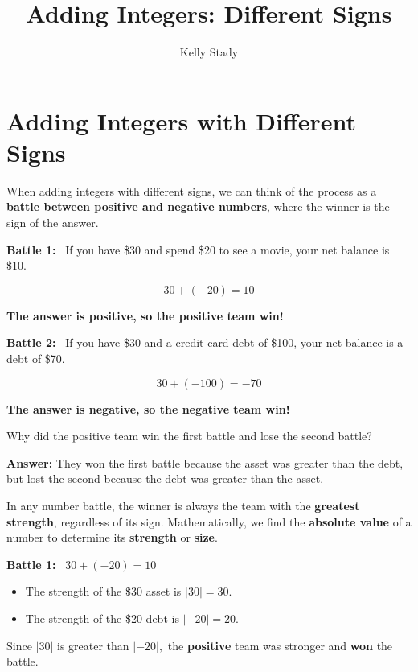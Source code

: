 \documentclass{ximera}[font=12pt]
\title{Adding Integers: Different Signs}   %
\author{Kelly Stady}
\begin{document}
\begin{abstract}

\end{abstract}

\maketitle
\label{xim:AddIntDiffSActivity}


\section*{Adding Integers with Different Signs}

When adding integers with different signs, we can think of the process as a
\textbf{battle between positive and negative numbers}, where the winner is the sign of
the answer.


\textbf{Battle 1:}  \ If you have \$30 and spend \$20 to see a movie, your net balance is \$10. 

\[ 30 + (-20) = 10 \]

\textbf{The answer is positive, so the positive team win!}


\textbf{Battle 2:} \ If you have \$30 and a credit card debt of \$100, your net balance is a debt of \$70.


\[ 30 + (-100) = -70 \]

\textbf{The answer is negative, so the negative team win!}

Why did the positive team win the first battle and lose the second battle?

\hspace{0.2in} \textbf{Answer:}  They won the first battle because the asset was greater than the debt, but lost the second because
the debt was greater than the asset. 



In any number battle, the winner is always the team with the \textbf{greatest strength}, regardless of its sign.  
Mathematically, we find the \textbf{absolute value} of a number to determine its \textbf{strength} or \textbf{size}.  


\textbf{Battle 1:} \ $30 + (-20) = 10$
\begin{itemize}
    \item The strength of the \$30 asset is $|30| = 30$.
    \item The strength of the \$20 debt is $|-20| = 20$.
\end{itemize}


Since $|30|$ is greater than $|-20|,$ the \textbf{positive} team was stronger and \textbf{won} the battle.
\end{document}

